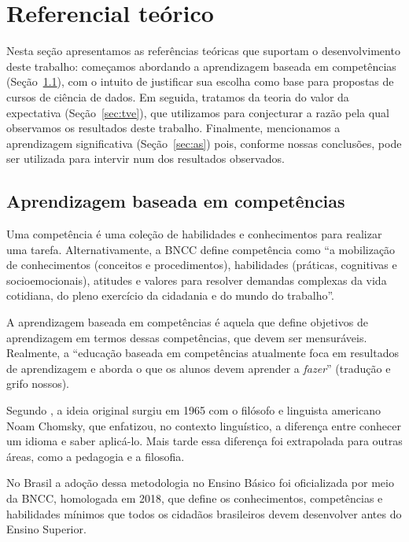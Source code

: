 \section{Referencial teórico}
\label{sec:referencial-teorico}

Nesta seção apresentamos as referências teóricas que suportam o desenvolvimento deste trabalho: começamos abordando a aprendizagem baseada em competências ({Seção~\ref{sec:competencias}}), com o intuito de justificar sua escolha como base para propostas de cursos de ciência de dados.
Em seguida, tratamos da teoria do valor da expectativa (Seção~\ref{sec:tve}), que utilizamos para conjecturar a razão pela qual observamos os resultados deste trabalho.
Finalmente, mencionamos a aprendizagem significativa (Seção~\ref{sec:as}) pois, conforme nossas conclusões, pode ser utilizada para intervir num dos resultados observados.

\subsection{Aprendizagem baseada em competências}
\label{sec:competencias}

Uma competência é uma coleção de habilidades e conhecimentos para realizar uma tarefa.
Alternativamente, a BNCC \cite{BNCC} define competência como ``a mobilização de conhecimentos (conceitos e procedimentos), habilidades (práticas, cognitivas e socioemocionais), atitudes e valores para resolver demandas complexas da vida cotidiana, do pleno exercício da cidadania e do mundo do trabalho''.

A aprendizagem baseada em competências é aquela que define objetivos de aprendizagem em termos dessas competências, que devem ser mensuráveis.
Realmente, a ``educação baseada em competências atualmente foca em resultados de aprendizagem e aborda o que os alunos devem aprender a \emph{fazer}'' \cite{Butova2015} (tradução e grifo nossos).

Segundo \cite{Butova2015}, a ideia original surgiu em 1965 com o filósofo e linguista americano Noam Chomsky, que enfatizou, no contexto linguístico, a diferença entre conhecer um idioma e saber aplicá-lo.
Mais tarde essa diferença foi extrapolada para outras áreas, como a pedagogia e a filosofia.

No Brasil a adoção dessa metodologia no Ensino Básico foi oficializada por meio da BNCC, homologada em 2018, que define os conhecimentos, competências e habilidades mínimos que todos os cidadãos brasileiros devem desenvolver antes do Ensino Superior.

